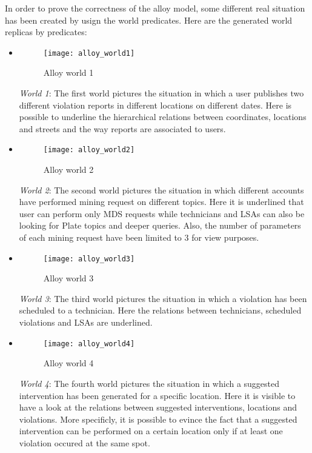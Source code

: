 In order to prove the correctness of the alloy model, some different real situation has been created by usign the world predicates.
Here are the generated world replicas by predicates:
\begin{itemize}
    \item 
        \begin{figure}[H]
            \centering
            \texttt{[image: alloy\_world1]}
            \caption{Alloy world 1}
            \label{fig:alloy_World1}
        \end{figure}
        \textit{World 1}: The first world pictures the situation in which a user publishes two different violation reports in different locations on different dates. Here is possible to underline the hierarchical relations between coordinates, locations and streets and the way reports are associated to users.
    \item 
        \begin{figure}[H]
            \centering
            \texttt{[image: alloy\_world2]}
            \caption{Alloy world 2}
            \label{fig:alloy_World2}
        \end{figure}
        \textit{World 2}: The second world pictures the situation in which different accounts have performed mining request on different topics. Here it is underlined that user can perform only MDS requests while technicians and LSAs can also be looking for Plate topics and deeper queries. Also, the number of parameters of each mining request have been limited to 3 for view purposes.
    \item 
        \begin{figure}[H]
            \centering
            \texttt{[image: alloy\_world3]}
            \caption{Alloy world 3}
            \label{fig:alloy_World3}
        \end{figure}
        \textit{World 3}: The third world pictures the situation in which a violation has been scheduled to a technician. Here the relations between technicians, scheduled violations and LSAs are underlined.
        \newpage
    \item 
        \begin{figure}[H]
            \centering
            \texttt{[image: alloy\_world4]}
            \caption{Alloy world 4}
            \label{fig:alloy_World4}
        \end{figure}
        \textit{World 4}: The fourth world pictures the situation in which a suggested intervention has been generated for a specific location. Here it is visible to have a look at the relations between suggested interventions, locations and violations. More specificly, it is possible to evince the fact that a suggested intervention can be performed on a certain location only if at least one violation occured at the same spot.
\end{itemize}